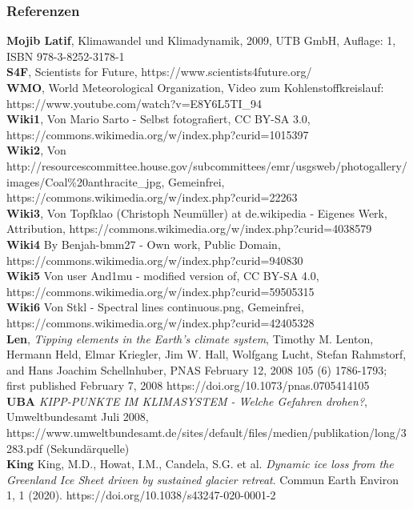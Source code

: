 \begin{frame}
	\frametitle{Referenzen}
	\small{
	\textbf{Mojib Latif}, Klimawandel und Klimadynamik, 2009, UTB GmbH, Auflage: 1, ISBN 978-3-8252-3178-1\\
	\textbf{S4F}, Scientists for Future, https://www.scientists4future.org/\\
	\textbf{WMO}, World Meteorological Organization, Video zum Kohlenstoffkreislauf: https://www.youtube.com/watch?v=E8Y6L5TI\_94\\
	\textbf{Wiki1}, Von Mario Sarto - Selbst fotografiert, CC BY-SA 3.0, https://commons.wikimedia.org/w/index.php?curid=1015397\\
	\textbf{Wiki2}, Von http://resourcescommittee.house.gov/subcommittees/emr/usgsweb/photogallery/images/Coal\%20anthracite\_jpg, Gemeinfrei, https://commons.wikimedia.org/w/index.php?curid=22263\\
	\textbf{Wiki3}, Von Topfklao (Christoph Neumüller) at de.wikipedia - Eigenes Werk, Attribution, https://commons.wikimedia.org/w/index.php?curid=4038579\\
	\textbf{Wiki4} By Benjah-bmm27 - Own work, Public Domain, https://commons.wikimedia.org/w/index.php?curid=940830\\
	\textbf{Wiki5} Von user And1mu - modified version of, CC BY-SA 4.0, https://commons.wikimedia.org/w/index.php?curid=59505315\\
	\textbf{Wiki6} Von Stkl - Spectral lines continuous.png, Gemeinfrei, https://commons.wikimedia.org/w/index.php?curid=42405328\\
	\textbf{Len}, \textit{Tipping elements in the Earth's climate system},
	Timothy M. Lenton, Hermann Held, Elmar Kriegler, Jim W. Hall, Wolfgang Lucht, Stefan Rahmstorf, and Hans Joachim Schellnhuber,
	PNAS February 12, 2008 105 (6) 1786-1793; first published February 7, 2008 https://doi.org/10.1073/pnas.0705414105 \\
	\textbf{UBA} \textit{KIPP-PUNKTE IM KLIMASYSTEM - Welche Gefahren drohen?}, Umweltbundesamt Juli 2008, https://www.umweltbundesamt.de/sites/default/files/medien/publikation/long/3283.pdf (Sekundärquelle)\\
	\textbf{King} King, M.D., Howat, I.M., Candela, S.G. et al. \textit{Dynamic ice loss from the Greenland Ice Sheet driven by sustained glacier retreat}. Commun Earth Environ 1, 1 (2020). https://doi.org/10.1038/s43247-020-0001-2
	}
\end{frame}
